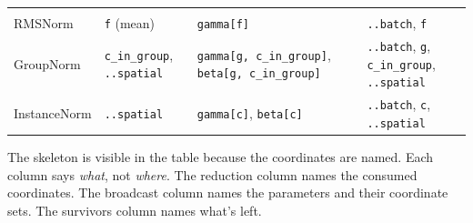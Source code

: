 \documentclass[11pt,titlepage]{article}
\begin{document}
\begin{longtable}[]{@{}llll@{}}
\begin{minipage}[t]{0.22\columnwidth}
\end{minipage}\tabularnewline
\begin{minipage}[t]{0.22\columnwidth}\raggedright
RMSNorm\strut
\end{minipage} & \begin{minipage}[t]{0.22\columnwidth}\raggedright
\texttt{f} (mean)\strut
\end{minipage} & \begin{minipage}[t]{0.22\columnwidth}\raggedright
\texttt{gamma{[}f{]}}\strut
\end{minipage} & \begin{minipage}[t]{0.22\columnwidth}\raggedright
\texttt{..batch}, \texttt{f}\strut
\end{minipage}\tabularnewline
\begin{minipage}[t]{0.22\columnwidth}\raggedright
GroupNorm\strut
\end{minipage} & \begin{minipage}[t]{0.22\columnwidth}\raggedright
\texttt{c\_in\_group}, \texttt{..spatial}\strut
\end{minipage} & \begin{minipage}[t]{0.22\columnwidth}\raggedright
\texttt{gamma{[}g,\ c\_in\_group{]}},
\texttt{beta{[}g,\ c\_in\_group{]}}\strut
\end{minipage} & \begin{minipage}[t]{0.22\columnwidth}\raggedright
\texttt{..batch}, \texttt{g}, \texttt{c\_in\_group},
\texttt{..spatial}\strut
\end{minipage}\tabularnewline
\begin{minipage}[t]{0.22\columnwidth}\raggedright
InstanceNorm\strut
\end{minipage} & \begin{minipage}[t]{0.22\columnwidth}\raggedright
\texttt{..spatial}\strut
\end{minipage} & \begin{minipage}[t]{0.22\columnwidth}\raggedright
\texttt{gamma{[}c{]}}, \texttt{beta{[}c{]}}\strut
\end{minipage} & \begin{minipage}[t]{0.22\columnwidth}\raggedright
\texttt{..batch}, \texttt{c}, \texttt{..spatial}\strut
\end{minipage}\tabularnewline
\bottomrule
\end{longtable}

The skeleton is visible in the table because the coordinates are named.
Each column says \emph{what}, not \emph{where}. The reduction column
names the consumed coordinates. The broadcast column names the
parameters and their coordinate sets. The survivors column names what's
left.
\end{document}
